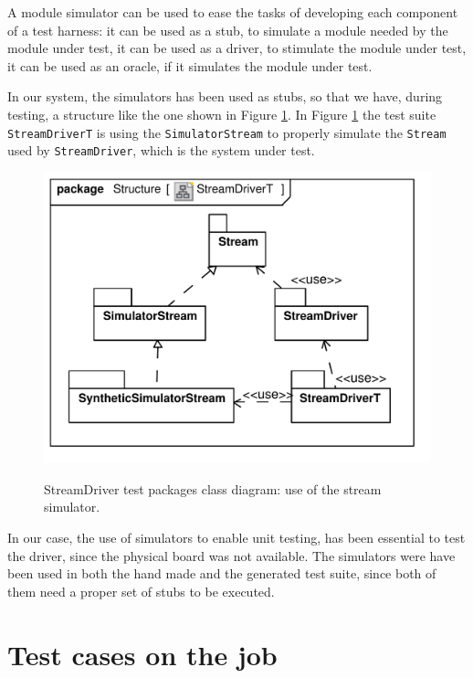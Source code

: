 \documentclass{article} \usepackage{times}
\newcommand{\lil}[1]{\texttt{\lstinline|#1|}}
\begin{document}
A module simulator can be used to ease the tasks of developing each
component of a test harness: it can be used as a stub, to simulate a
module needed by the module under test, it can be used as a driver, to
stimulate the module under test, it can be used as an oracle, if it
simulates the module under test.

In our system, the simulators has been used as stubs, so that we have,
during testing, a structure like the one shown in Figure
\ref{fig:class_diagram_streamdriver_test}.  In Figure
\ref{fig:class_diagram_streamdriver_test} the test suite
\lil{StreamDriverT} is using the \lil{SimulatorStream} to properly
simulate the \lil{Stream} used by \lil{StreamDriver}, which is the
system under test.

\begin{figure}[htb!]
  \centering
  \includegraphics[scale=0.4]{UML_model/Class_Diagram__Structure__StreamDriverT}
  \label{fig:class_diagram_streamdriver_test}
  \caption{StreamDriver test packages class diagram: use of the stream
    simulator.}
\end{figure}

In our case, the use of simulators to enable unit testing, has been
essential to test the \STSB driver, since the physical board was not
available.  The simulators were have been used in both the hand made
and the generated test suite, since both of them need a proper set of
stubs to be executed.




\section{Test cases on the job}
\label{sec:test_cases_on_the_job}
\end{document}
